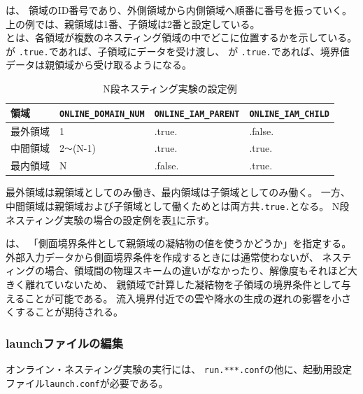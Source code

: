 \noindent
{}は、
領域のID番号であり、外側領域から内側領域へ順番に番号を振っていく。
上の例では、親領域は1番、子領域は2番と設定している。\\
とは、各領域が複数のネスティング領域の中でどこに位置するかを示している。
 が \verb|.true.|であれば、子領域にデータを受け渡し、
 が \verb|.true.|であれば、境界値データは親領域から受け取るようになる。


\begin{table}[htb]
\begin{center}
\caption{N段ネスティング実験の設定例}
\begin{tabularx}{150mm}{|l|l|l|X|} \hline
 \rowcolor[gray]{0.9} 領域 & \verb|ONLINE_DOMAIN_NUM| & \verb|ONLINE_IAM_PARENT| & \verb|ONLINE_IAM_CHILD|\\ \hline
 最外領域 & 1               & .true.  & .false. \\ \hline
 中間領域 & 2\verb|〜|(N-1) & .true.  & .true. \\ \hline
 最内領域 & N               & .false. & .true. \\ \hline
\end{tabularx}
\label{tab:triple_nested}
\end{center}
\end{table}

\noindent 最外領域は親領域としてのみ働き、最内領域は子領域としてのみ働く。
一方、中間領域は親領域および子領域として働くためとは両方共\verb|.true.|となる。
N段ネスティング実験の場合の設定例を表\ref{tab:triple_nested}に示す。


は、
「側面境界条件として親領域の凝結物の値を使うかどうか」を指定する。
外部入力データから側面境界条件を作成するときには通常使わないが、
ネスティングの場合、領域間の物理スキームの違いがなかったり、解像度もそれほど大きく離れていないため、
親領域で計算した凝結物を子領域の境界条件として与えることが可能である。
流入境界付近での雲や降水の生成の遅れの影響を小さくすることが期待される。



\subsubsection{launchファイルの編集}
\label{subsubsec:launch}
オンライン・ネスティング実験の実行には、
\verb|run.***.conf|の他に、起動用設定ファイル\verb|launch.conf|が必要である。\\

